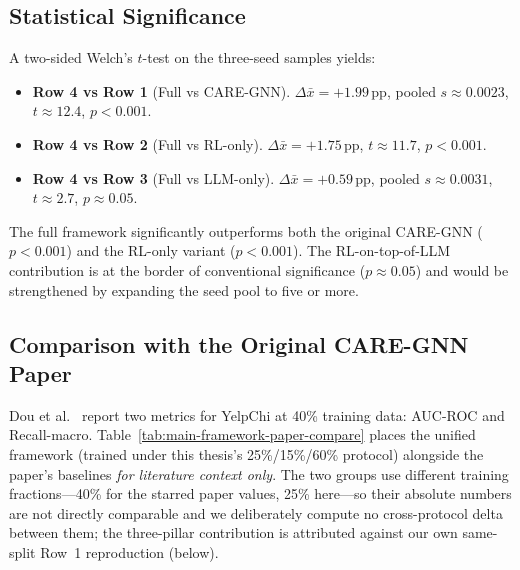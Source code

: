 \subsection{Statistical Significance}
\label{sec:yelp-significance}

A two-sided Welch's $t$-test on the three-seed samples yields:
\begin{itemize}
    \item \textbf{Row 4 vs Row 1} (Full vs CARE-GNN). $\Delta\bar{x} = +1.99$\,pp, pooled $s \approx 0.0023$, $t \approx 12.4$, $p < 0.001$.
    \item \textbf{Row 4 vs Row 2} (Full vs RL-only). $\Delta\bar{x} = +1.75$\,pp, $t \approx 11.7$, $p < 0.001$.
    \item \textbf{Row 4 vs Row 3} (Full vs LLM-only). $\Delta\bar{x} = +0.59$\,pp, pooled $s \approx 0.0031$, $t \approx 2.7$, $p \approx 0.05$.
\end{itemize}

\noindent
The full framework significantly outperforms both the original CARE-GNN ($p < 0.001$) and the RL-only variant ($p < 0.001$). The RL-on-top-of-LLM contribution is at the border of conventional significance ($p \approx 0.05$) and would be strengthened by expanding the seed pool to five or more.

\subsection{Comparison with the Original CARE-GNN Paper}
\label{sec:yelp-paper-compare}

Dou et al.~\cite{dou2020enhancing} report two metrics for YelpChi at 40\% training data: AUC-ROC and Recall-macro. Table~\ref{tab:main-framework-paper-compare} places the unified framework (trained under this thesis's 25\%/15\%/60\% protocol) alongside the paper's baselines \emph{for literature context only}. The two groups use different training fractions---40\% for the starred paper values, 25\% here---so their absolute numbers are not directly comparable and we deliberately compute no cross-protocol delta between them; the three-pillar contribution is attributed against our own same-split Row~1 reproduction (below).


